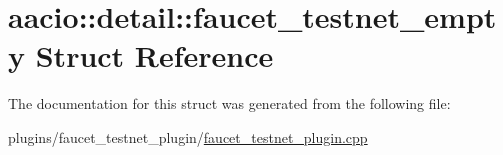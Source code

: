 \hypertarget{structaacio_1_1detail_1_1faucet__testnet__empty}{}\section{aacio\+:\+:detail\+:\+:faucet\+\_\+testnet\+\_\+empty Struct Reference}
\label{structaacio_1_1detail_1_1faucet__testnet__empty}


The documentation for this struct was generated from the following file\+:\begin{DoxyCompactItemize}
\item 
plugins/faucet\+\_\+testnet\+\_\+plugin/\mbox{\hyperlink{faucet__testnet__plugin_8cpp}{faucet\+\_\+testnet\+\_\+plugin.\+cpp}}\end{DoxyCompactItemize}
